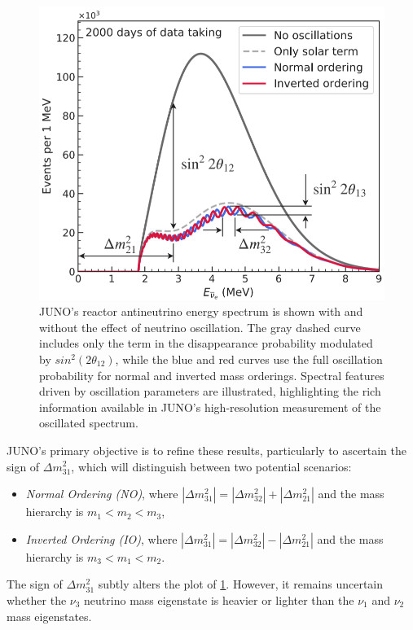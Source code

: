 \begin{figure}[h]
	\begin{minipage}{.4\textwidth}
		\caption{JUNO's reactor antineutrino energy spectrum is shown with and without the effect of neutrino oscillation. The gray dashed curve includes only the term in the disappearance probability modulated by $sin^2(2\theta_{12})$, while the blue and red curves use the full oscillation probability for normal and inverted mass orderings. Spectral features driven by oscillation parameters are illustrated, highlighting the rich information available in JUNO's high-resolution measurement of the oscillated spectrum.}
		\label{fig:antineutinotoantineutrinoprobabilityplot}
	\end{minipage}%
	\hspace{1cm}
	\begin{minipage}{.5\textwidth}
		\includegraphics[width=\linewidth]{Images/antineutino_to_antineutrino_probability_plot}
	\end{minipage}
\end{figure}

\newpage


JUNO's primary objective is to refine these results, particularly to ascertain the sign of $\Delta m_{31}^2$, which will distinguish between two potential scenarios:
\begin{itemize}
	\item \textit{Normal Ordering (NO)}, where $\left|\Delta m_{31}^2\right|=\left|\Delta m_{32}^2\right|+\left|\Delta m_{21}^2\right|$ and the mass hierarchy is $m_1<m_2<m_3$,
	\item \textit{Inverted Ordering (IO)}, where $\left|\Delta m_{31}^2\right|=\left|\Delta m_{32}^2\right|-\left|\Delta m_{21}^2\right|$ and the mass hierarchy is $m_3<m_1<m_2$.
\end{itemize}
The sign of $\Delta m_{31}^2$ subtly alters the plot of \ref{fig:antineutinotoantineutrinoprobabilityplot}. However, it remains uncertain whether the $\nu_3$ neutrino mass eigenstate is heavier or lighter than the $\nu_1$ and $\nu_2$ mass eigenstates.


